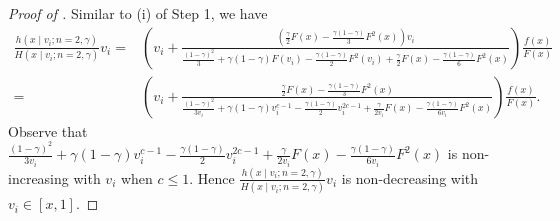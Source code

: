 \begin{proof}[{Proof of }]
\medskip

\noindent Similar to (i) of Step 1, we have 
\begin{align*}
\frac{h(x\mid v_i;n=2,\gamma)}{H(x\mid v_i;n=2,\gamma)}v_i 
=&\left(v_i + \frac{\left(\frac{\gamma}{2} F\left(x\right) - \frac{\gamma(1-\gamma)}{3} F^2\left(x\right)\right)v_i}{\frac{ (1-\gamma)^2}{3}  + \gamma (1-\gamma)F\left(v_{i}\right) - \frac{\gamma(1-\gamma)}{2} F^2\left(v_{i}\right) + \frac{\gamma}{2}  F\left(x\right)  - \frac{\gamma(1-\gamma)}{6}F^2\left(x\right)} \right)\frac{f(x)}{F(x)}\\
=&\left(v_i + \frac{\frac{\gamma}{2} F\left(x\right) - \frac{\gamma(1-\gamma)}{3} F^2\left(x\right)}{\frac{ (1-\gamma)^2}{3v_i}  + \gamma (1-\gamma)v_i^{c-1} - \frac{\gamma(1-\gamma)}{2} v_i^{2c-1} + \frac{\gamma}{2v_i}  F\left(x\right)  - \frac{\gamma(1-\gamma)}{6v_i}F^2\left(x\right)} \right)\frac{f(x)}{F(x)}.
\end{align*}
Observe that 
$\frac{ (1-\gamma)^2}{3v_i}  + \gamma (1-\gamma)v_i^{c-1} - \frac{\gamma(1-\gamma)}{2} v_i^{2c-1} + \frac{\gamma}{2v_i}  F\left(x\right)  - \frac{\gamma(1-\gamma)}{6v_i}F^2\left(x\right)$ is non-increasing with $v_i$ when $c\leq 1$. Hence $\frac{h(x\mid v_i;n=2,\gamma)}{H(x\mid v_i;n=2,\gamma)}v_i$ is non-decreasing with $v_i \in [x,1]$.
\end{proof}

